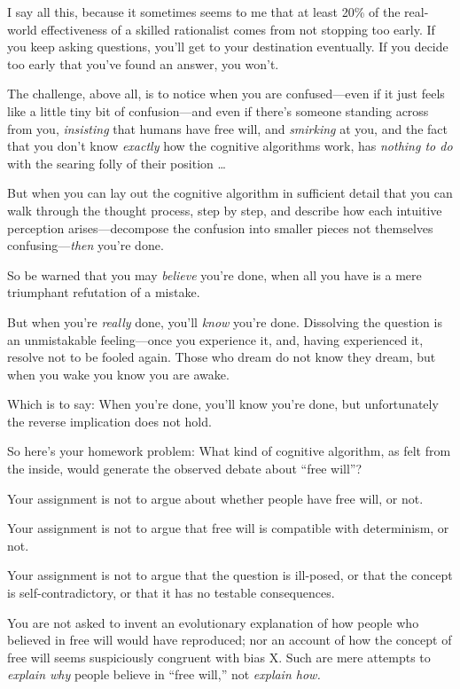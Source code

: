 {
 I say all this, because it sometimes seems to me that at least
20\% of the real-world effectiveness of a skilled rationalist comes
from not stopping too early. If you keep asking questions,
you'll get to your destination eventually. If you
decide too early that you've found an answer, you
won't.}

{
 The challenge, above all, is to notice when you are
confused---even if it just feels like a little tiny bit of
confusion---and even if there's someone standing across
from you, \textit{insisting} that humans have free will, and
\textit{smirking} at you, and the fact that you don't
know \textit{exactly} how the cognitive algorithms work, has
\textit{nothing to do} with the searing folly of their position \ldots}

{
 But when you can lay out the cognitive algorithm in sufficient
detail that you can walk through the thought process, step by step, and
describe how each intuitive perception arises---decompose the confusion
into smaller pieces not themselves confusing---\textit{then}
you're done.}

{
 So be warned that you may \textit{believe} you're
done, when all you have is a mere triumphant refutation of a mistake.}

{
 But when you're \textit{really} done,
you'll \textit{know} you're done.
Dissolving the question is an unmistakable feeling---once you
experience it, and, having experienced it, resolve not to be fooled
again. Those who dream do not know they dream, but when you wake you
know you are awake.}

{
 Which is to say: When you're done,
you'll know you're done, but
unfortunately the reverse implication does not hold.}

{
 So here's your homework problem: What kind of
cognitive algorithm, as felt from the inside, would generate the
observed debate about ``free
will''?}

{
 Your assignment is not to argue about whether people have free
will, or not.}

{
 Your assignment is not to argue that free will is compatible with
determinism, or not.}

{
 Your assignment is not to argue that the question is ill-posed, or
that the concept is self-contradictory, or that it has no testable
consequences.}

{
 You are not asked to invent an evolutionary explanation of how
people who believed in free will would have reproduced; nor an account
of how the concept of free will seems suspiciously congruent with bias
X. Such are mere attempts to \textit{explain why} people believe in
``free will,'' not \textit{explain
how.}}

